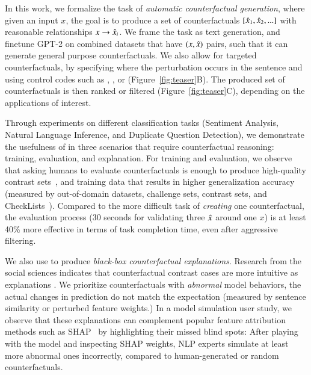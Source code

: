 In this work, we formalize the task of \emph{automatic counterfactual generation}, where given an input $x$, the goal is to produce a set of counterfactuals $[\hat{x}_1, \hat{x}_2, ...]$ with reasonable relationships $x \rightarrow \hat{x}_i$. 
We frame the task as text generation, and finetune GPT-2 \cite{radford2019language} on combined datasets that have $(x, \hat{x})$ pairs, such that it can generate general purpose counterfactuals. 
We also allow for targeted counterfactuals, by specifying where the perturbation occurs in the sentence \cite{donahue2020enabling} and using control codes such as , , or  (Figure~\ref{fig:teaser}B). 
The produced set of counterfactuals is then ranked or filtered (Figure~\ref{fig:teaser}C), depending on the applications of interest.

Through experiments on different classification tasks (Sentiment Analysis, Natural Language Inference, and Duplicate Question Detection), we demonstrate the usefulness of \sysname in three scenarios that require counterfactual reasoning: training, evaluation, and explanation. 
For training and evaluation, we observe that asking humans to evaluate counterfactuals is enough to produce high-quality contrast sets~\cite{gardner2020contrast}, and training data that results in higher generalization accuracy (measured by out-of-domain datasets, challenge sets, contrast sets, and CheckLists~\cite{checklist:acl20}).
Compared to the more difficult task of \emph{creating} one counterfactual, the evaluation process (30 seconds for validating three $\hat{x}$ around one $x$) is at least 40\% more effective in terms of task completion time, even after aggressive filtering.


We also use \sysname to produce \emph{black-box counterfactual explanations}. 
Research from the social sciences indicates that counterfactual contrast cases are more intuitive as explanations \cite{miller}.
We prioritize counterfactuals with \emph{abnormal} model behaviors, \ie the actual changes in prediction do not match the expectation (measured by sentence similarity or perturbed feature weights.)
In a model simulation user study, we observe that these explanations can complement popular feature attribution methods such as SHAP~\cite{NIPS2017_7062} by highlighting their missed blind spots: 
After playing with the model and inspecting SHAP weights, NLP experts simulate at least  more abnormal ones incorrectly, compared to human-generated or random counterfactuals.